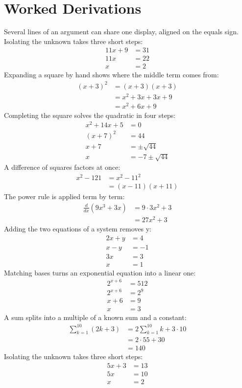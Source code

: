 \documentclass[11pt]{article}
\begin{document}
\section*{Worked Derivations}
Several lines of an argument can share one display, aligned on the equals sign.
Isolating the unknown takes three short steps:
\label{eq038}\begin{align*} 11x + 9 &= 31 \\ 11x &= 22 \\ x &= 2 \end{align*}
Expanding a square by hand shows where the middle term comes from:
\label{eq039}\begin{align*} (x + 3)^2 &= (x + 3)(x + 3) \\ &= x^2 + 3x + 3x + 9 \\ &= x^2 + 6x + 9 \end{align*}
Completing the square solves the quadratic in four steps:
\label{eq040}\begin{align*} x^2 + 14x + 5 &= 0 \\ (x + 7)^2 &= 44 \\ x + 7 &= \pm\sqrt{44} \\ x &= -7 \pm \sqrt{44} \end{align*}
A difference of squares factors at once:
\label{eq041}\begin{align*} x^2 - 121 &= x^2 - 11^2 \\ &= (x - 11)(x + 11) \end{align*}
The power rule is applied term by term:
\label{eq042}\begin{align*} \frac{d}{dx}\left(9x^3 + 3x\right) &= 9 \cdot 3x^2 + 3 \\ &= 27x^2 + 3 \end{align*}
Adding the two equations of a system removes y:
\label{eq043}\begin{align*} 2x + y &= 4 \\ x - y &= -1 \\ 3x &= 3 \\ x &= 1 \end{align*}
Matching bases turns an exponential equation into a linear one:
\label{eq044}\begin{align*} 2^{x + 6} &= 512 \\ 2^{x + 6} &= 2^{9} \\ x + 6 &= 9 \\ x &= 3 \end{align*}
A sum splits into a multiple of a known sum and a constant:
\label{eq045}\begin{align*} \sum_{k=1}^{10} (2k + 3) &= 2\sum_{k=1}^{10} k + 3 \cdot 10 \\ &= 2 \cdot 55 + 30 \\ &= 140 \end{align*}
Isolating the unknown takes three short steps:
\label{eq046}\begin{align*} 5x + 3 &= 13 \\ 5x &= 10 \\ x &= 2 \end{align*}
\end{document}
